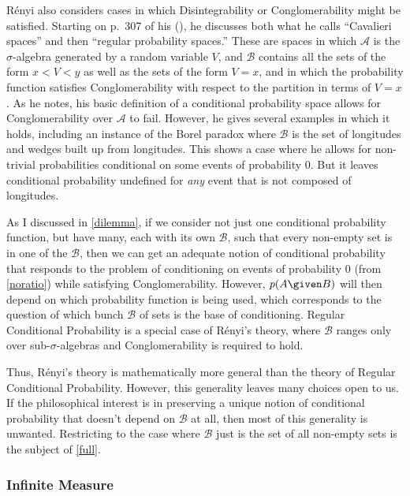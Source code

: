 R\'{e}nyi also considers cases in which Disintegrability or Conglomerability might be satisfied. Starting on p.\ 307 of his (\citeyear{renyinew}), he discusses both what he calls ``Cavalieri spaces'' and then ``regular probability spaces.'' These are spaces in which $\mathcal{A}$ is the $\sigma$-algebra generated by a random variable $V$, and $\mathcal{B}$ contains all the sets of the form $x<V<y$ as well as the sets of the form $V=x$, and in which the probability function satisfies Conglomerability with respect to the partition in terms of $V=x$. As he notes, his basic definition of a conditional probability space allows for Conglomerability over $\mathcal{A}$ to fail. However, he gives several examples in which it holds, including an instance of the Borel paradox where $\mathcal{B}$ is the set of longitudes and wedges built up from longitudes. This shows a case where he allows for non-trivial probabilities conditional on some events of probability $0$. But it leaves conditional probability undefined for \emph{any} event that is not composed of longitudes.

As I discussed in \autoref{dilemma}, if we consider not just one conditional probability function, but have many, each with its own $\mathcal{B}$, such that every non-empty set is in one of the $\mathcal{B}$, then we can get an adequate notion of conditional probability that responds to the problem of conditioning on events of probability $0$ (from \autoref{noratio}) while satisfying Conglomerability. However, $p(A \given B)$ will then depend on which probability function is being used, which corresponds to the question of which bunch $\mathcal{B}$ of sets is the base of conditioning. Regular Conditional Probability is a special case of R\'{e}nyi's theory, where $\mathcal{B}$ ranges only over sub-$\sigma$-algebras and Conglomerability is required to hold.

Thus, R\'{e}nyi's theory is mathematically more general than the theory of Regular Conditional Probability. However, this generality leaves many choices open to us. If the philosophical interest is in preserving a unique notion of conditional probability that doesn't depend on $\mathcal{B}$ at all, then most of this generality is unwanted. Restricting to the case where $\mathcal{B}$ just is the set of all non-empty sets is the subject of \autoref{full}.

\subsubsection{Infinite Measure}

